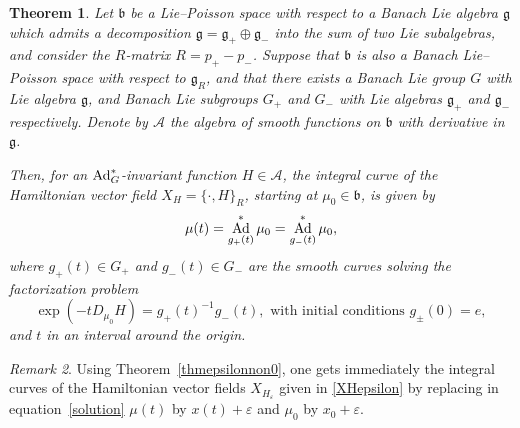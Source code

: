 \documentclass[a4paper,12pt,reqno]{amsart}%
\newtheorem{theorem}{Theorem}
\theoremstyle{definition}
\theoremstyle{remark}
\newtheorem{remark}[theorem]{Remark}
\numberwithin{theorem}{section}
\numberwithin{equation}{section}
\newcommand{\1}{{\bf 1}}
\DeclareMathOperator{\Ad}{\textnormal{Ad}}
\newcommand{\g}{{\mathfrak g}}
\newcommand{\bg}{{\mathfrak b}}
\begin{document}
\begin{theorem}\label{integrale_curve} 
Let $\bg$ be a Lie--Poisson space with respect to a Banach Lie algebra $\g$ which admits a decomposition  $\g = \g_+ \oplus \g_-$ into the sum of two Lie subalgebras, and 
consider the  $R$-matrix $R = p_+ - p_-$. Suppose that $\bg$ is also  a Banach Lie--Poisson space with respect to  $\g_R$, and that there exists a Banach Lie group $G$ with Lie algebra $\g$, and Banach Lie subgroups $G_+$ and $G_-$ with Lie algebras $\g_+$ and $\g_-$ respectively. Denote by $\mathcal{A}$ the algebra of smooth functions on $\bg$ with derivative in $\g$.

    Then, for  an $\Ad^*_G$-invariant function $H\in \mathcal{A}$, the integral curve of the Hamiltonian vector field $X_H = \{\cdot, H\}_R$, starting at $\mu_0\in\bg$, is given by
    \begin{equation}\label{solution}
    \mu(t) = \Ad^*_{g_+(t)}\mu_0 = \Ad^*_{g_-(t)}\mu_0,
    \end{equation}
    where $g_+(t)\in G_+$ and $g_-(t)\in G_-$ are the smooth curves solving the factorization problem
    \begin{equation}\label{factorisation}
    \exp(-t D_{\mu_0}H) = g_+(t)^{-1} g_-(t), \textrm{  with initial conditions } g_\pm(0) = e,
    \end{equation}
    and $t$ in an interval around the origin.
\end{theorem}
\begin{remark}
    Using Theorem~\ref{thmepsilonnon0}, one gets immediately the integral curves of the Hamiltonian vector fields $X_{H_\varepsilon}$ given in \eqref{XHepsilon} by replacing in equation~\eqref{solution} $\mu(t) $ by $x(t) + \varepsilon$ and $\mu_0$ by $x_0 + \varepsilon$.
\end{remark}
\end{document}
